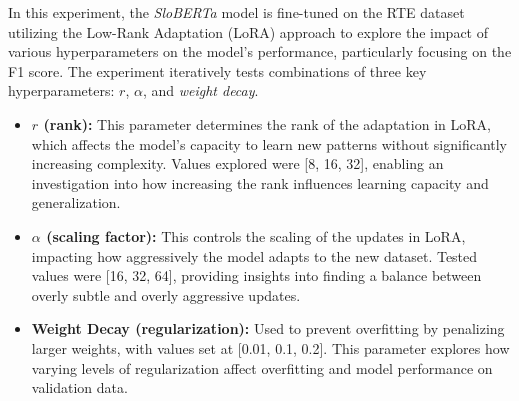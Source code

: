 \documentclass[fleqn,moreauthors,10pt]{ds_report}
\begin{document}
In this experiment, the \textit{SloBERTa} model is fine-tuned on the RTE dataset utilizing the Low-Rank Adaptation (LoRA) approach to explore the impact of various hyperparameters on the model's performance, particularly focusing on the F1 score. The experiment iteratively tests combinations of three key hyperparameters: \( r \), \( \alpha \), and \textit{weight decay}.

\begin{itemize}
    \item \textbf{\( r \) (rank):} This parameter determines the rank of the adaptation in LoRA, which affects the model's capacity to learn new patterns without significantly increasing complexity. Values explored were [8, 16, 32], enabling an investigation into how increasing the rank influences learning capacity and generalization.
    \item \textbf{\( \alpha \) (scaling factor):} This controls the scaling of the updates in LoRA, impacting how aggressively the model adapts to the new dataset. Tested values were [16, 32, 64], providing insights into finding a balance between overly subtle and overly aggressive updates.
    \item \textbf{Weight Decay (regularization):} Used to prevent overfitting by penalizing larger weights, with values set at [0.01, 0.1, 0.2]. This parameter explores how varying levels of regularization affect overfitting and model performance on validation data.
\end{itemize}
\end{document}
